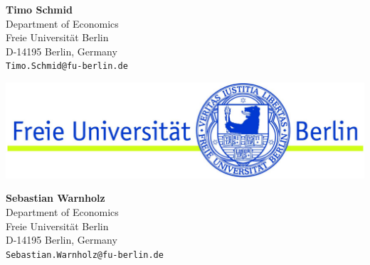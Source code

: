 \documentclass[a0,portrait]{a0poster}\usepackage[]{graphicx}\usepackage[]{color}
\begin{document}
\begin{multicols}{2}
\color{DarkSlateGray} %


\nocite{*} %

\end{multicols}


\vfill
\vspace{0.5cm}
\begin{minipage}[b]{0.3\linewidth}
  \Large\textbf{Timo Schmid}\\[0.5cm]
  \large 
  Department of Economics\\
  Freie Universit\"at Berlin\\
  D-14195 Berlin, Germany\\
  \texttt{Timo.Schmid@fu-berlin.de}
\end{minipage}
\hfill
\begin{minipage}[b]{0.3\linewidth}
\includegraphics[width=\linewidth]{FuBerlin}
\end{minipage}
\hfill
\begin{minipage}[b]{0.3\linewidth}
\begin{flushright}
  \Large\textbf{Sebastian Warnholz}\\[0.5cm]
  \large 
  Department of Economics\\
  Freie Universit\"at Berlin\\
  D-14195 Berlin, Germany\\
  \texttt{Sebastian.Warnholz@fu-berlin.de}
\end{flushright}
\end{minipage}
%

\end{document}
